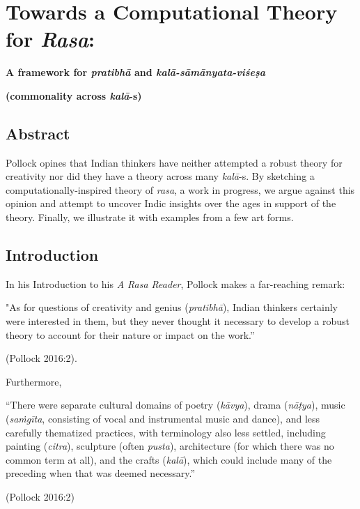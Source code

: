 \chapter[Towards a Computational Theory for \textsl{Rasa}:]{Towards a Computational Theory for \textsl{Rasa}:}\label{chapter\thechapter:begin}

\begin{center}
{\bf A framework for \textsl{pratibhā} and \textsl{kalā-sāmānyata-viśeṣa} }

{\bf (commonality across \textsl{kalā}-s)}
\end{center}


\section*{Abstract}

Pollock opines that Indian thinkers have neither attempted a robust theory for creativity nor did they have a theory across many \hbox{\textsl{kalā}-s}. By sketching a computationally-inspired theory of \textsl{rasa}, a work in progress, we argue against this opinion and attempt to uncover Indic insights over the ages in support of the theory. Finally, we illustrate it with examples from a few art forms.

\section{Introduction}\label{chap7-sec1}

In his Introduction to his \textsl{A Rasa Reader}, Pollock makes a far-reaching remark:

\begin{myquote}
"As for questions of creativity and genius (\textsl{pratibhā}), Indian thinkers certainly were interested in them, but they never thought it necessary to develop a robust theory to account for their nature or impact on the work.” 

\hfill (Pollock 2016:2).
\end{myquote}

Furthermore, 

\begin{myquote}
“There were separate cultural domains of poetry (\textsl{kāvya}), drama (\textsl{nāṭya}), music (\textsl{saṁgīta}, consisting of vocal and instrumental music and dance), and less carefully thematized practices, with terminology also less settled, including painting (\textsl{citra}), sculpture (often \textsl{pusta}), architecture (for which there was no common term at all), and the crafts (\textsl{kalā}), which could include many of the preceding when that was deemed necessary.” 

\hfill(Pollock 2016:2)
\end{myquote}

